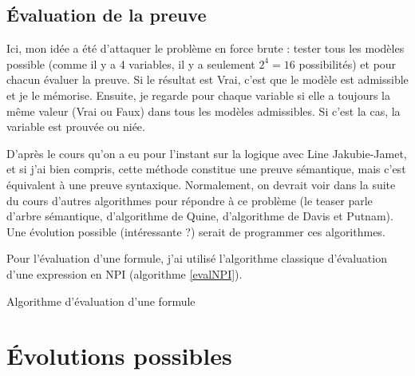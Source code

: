 \documentclass[12pt, algo]{cours}
\begin{document}
\subsection{Évaluation de la preuve}

Ici, mon idée a été d'attaquer le problème en force brute : tester tous les modèles possible (comme il y a 4 variables, il y a seulement $2^4=16$ possibilités) et pour chacun évaluer la preuve. Si le résultat est Vrai, c'est que le modèle est admissible et je le mémorise. Ensuite, je regarde pour chaque variable si elle a toujours la même valeur (Vrai ou Faux) dans tous les modèles admissibles. Si c'est la cas, la variable est prouvée ou niée.

\medskip
D'après le cours qu'on a eu pour l'instant sur la logique avec Line Jakubie-Jamet, et si j'ai bien compris, cette méthode constitue une preuve sémantique, mais c'est équivalent à une preuve syntaxique. Normalement, on devrait voir dans la suite du cours d'autres algorithmes pour répondre à ce problème (le teaser parle d'arbre sémantique, d'algorithme de Quine, d'algorithme de Davis et Putnam). Une évolution possible (intéressante ?) serait de programmer ces algorithmes.

\medskip

Pour l'évaluation d'une formule, j'ai utilisé l'algorithme classique d'évaluation d'une expression en NPI (algorithme \ref{evalNPI}).

\begin{algorithm}
\caption{Algorithme d'évaluation d'une formule}
\label{evalNPI}
\end{algorithm}

\section{Évolutions possibles}
\end{document}
